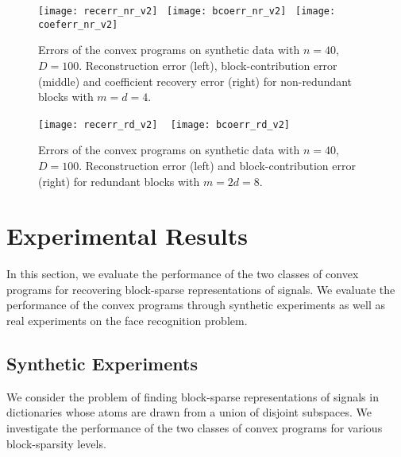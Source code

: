 \documentclass[10pt,twocolumn,twoside] {IEEEtran}
\begin{document}
{\begin{figure*}[t!]
\centering
\texttt{[image: recerr\_nr\_v2]} \
\texttt{[image: bcoerr\_nr\_v2]} \
\texttt{[image: coeferr\_nr\_v2]}
\vspace{-2mm}
\caption{\footnotesize{Errors of the convex programs on synthetic data with $n=40$, $D = 100$. Reconstruction error (left), block-contribution error (middle) and coefficient recovery error (right) for non-redundant blocks with $m = d = 4$.}}
\label{fig:nonred}
\end{figure*}
\begin{figure*}[t!]
\centering
\texttt{[image: recerr\_rd\_v2]} \ \hspace{5mm}
\texttt{[image: bcoerr\_rd\_v2]}
\vspace{-2mm}
\caption{\footnotesize{Errors of the convex programs on synthetic data with $n=40$, $D = 100$. Reconstruction error (left) and block-contribution error (right) for redundant blocks with $m = 2d = 8$.}}
\label{fig:red}
\end{figure*}

\section{Experimental Results}
\label{sec:experiment}
In this section, we evaluate the performance of the two classes of convex programs for recovering block-sparse representations of signals.  
We evaluate the performance of the convex programs through synthetic experiments as well as real experiments on the face recognition problem.

\subsection{Synthetic Experiments}
We consider the problem of finding block-sparse representations of signals in dictionaries whose atoms are drawn from a union of disjoint subspaces. We investigate the performance of the two classes of convex programs for various block-sparsity levels. 

}
\end{document}
